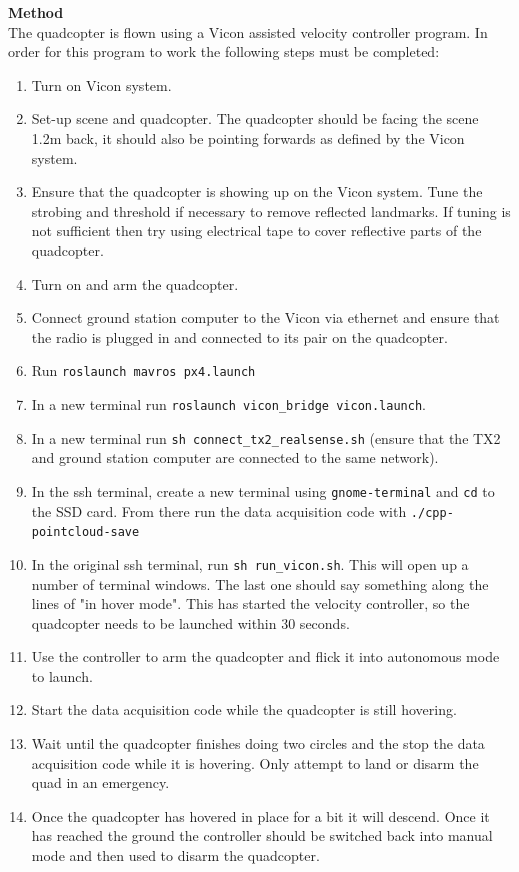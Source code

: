 \documentclass[12pt,a4paper]{article}
\begin{document}
\noindent
\textbf{Method} \\
The quadcopter is flown using a Vicon assisted velocity controller program. In order for this program to work the following steps must be completed:
\begin{enumerate}
\item Turn on Vicon system.
\item Set-up scene and quadcopter. The quadcopter should be facing the scene 1.2m back, it should also be pointing forwards as defined by the Vicon system.
\item Ensure that the quadcopter is showing up on the Vicon system. Tune the strobing and threshold if necessary to remove reflected landmarks. If tuning is not sufficient then try using electrical tape to cover reflective parts of the quadcopter.
\item Turn on and arm the quadcopter.
\item Connect ground station computer to the Vicon via ethernet and ensure that the radio is plugged in and connected to its pair on the quadcopter.
\item Run \verb|roslaunch mavros px4.launch|
\item In a new terminal run \verb|roslaunch vicon_bridge vicon.launch|.
\item In a new terminal run \verb|sh connect_tx2_realsense.sh| (ensure that the TX2 and ground station computer are connected to the same network).
\item In the ssh terminal, create a new terminal using \verb|gnome-terminal| and \verb|cd| to the SSD card. From there run the data acquisition code with \verb|./cpp-pointcloud-save|
\item In the original ssh terminal, run \verb|sh run_vicon.sh|. This will open up a number of terminal windows. The last one should say something along the lines of "in hover mode". This has started the velocity controller, so the quadcopter needs to be launched within 30 seconds.
\item Use the controller to arm the quadcopter and flick it into autonomous mode to launch.
\item Start the data acquisition code while the quadcopter is still hovering.
\item Wait until the quadcopter finishes doing two circles and the stop the data acquisition code while it is hovering. Only attempt to land or disarm the quad in an emergency.
\item Once the quadcopter has hovered in place for a bit it will descend. Once it has reached the ground the controller should be switched back into manual mode and then used to disarm the quadcopter.
\end{enumerate}
\end{document}
